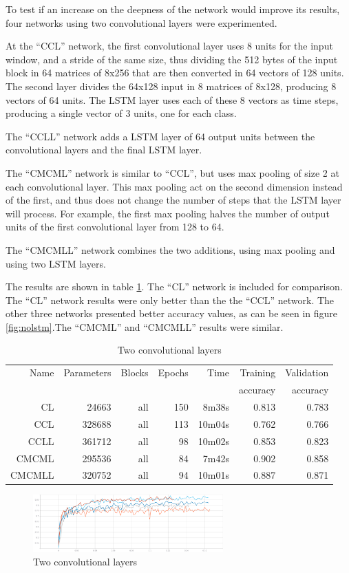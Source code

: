 To test if an increase on the deepness of the network would improve its results, four networks using two convolutional layers were experimented. 

At the ``CCL'' network, the first convolutional layer uses 8 units for the input window, and a stride of the same size, thus dividing the 512 bytes of the input block in 64 matrices of 8x256 that are then converted in 64 vectors of 128 units. The second layer divides the 64x128 input in 8 matrices of 8x128, producing 8 vectors of 64 units. The LSTM layer uses each of these 8 vectors as time steps, producing a single vector of 3 units, one for each class.

The ``CCLL'' network adds a LSTM layer of 64 output units between the convolutional layers and the final LSTM layer.

The ``CMCML'' network is similar to ``CCL'', but uses max pooling of size 2 at each convolutional layer. This max pooling act on the second dimension instead of the first, and thus does not change the number of steps that the LSTM layer will process. For example, the first max pooling halves the number of output units of the first convolutional layer from 128 to 64.

The ``CMCMLL'' network combines the two additions, using max pooling and using two LSTM layers.

The results are shown in table \ref{tab:carving2convs}. The ``CL'' network is included for comparison. The  ``CL'' network results were only better than the the ``CCL'' network. The other three networks presented better accuracy values, as can be seen in figure \ref{fig:nolstm}.The ``CMCML'' and ``CMCMLL'' results were similar.

\begin{table}[!ht]
    \centering
    \caption{Two convolutional layers}
    \label{tab:carving2convs}
\begin{tabular}{r|r|r|r|r|r|r}
\hline
Name & Parameters & Blocks & Epochs & Time & Training          & Validation          \\       
     &            &        &        &         &          accuracy &            accuracy \\ \hline\hline

CL & 24663  & all & 150 & 8m38s  & 0.813 & 0.783 \\ \hline
CCL    & 328688 & all & 113 & 10m04s & 0.762 & 0.766 \\ \hline
CCLL   & 361712 & all & 98  & 10m02s & 0.853 & 0.823 \\ \hline
CMCML  & 295536 & all & 84  & 7m42s  & 0.902 & 0.858 \\ \hline
CMCMLL & 320752 & all & 94  & 10m01s & 0.887 & 0.871 \\ \hline
\end{tabular}
\end{table}

\begin{figure}[htb!]
\centering\includegraphics[width=0.65\textwidth]{content/twoconvs.png}
\caption{\label{fig:twoconvs}Two convolutional layers}%
\end{figure}
